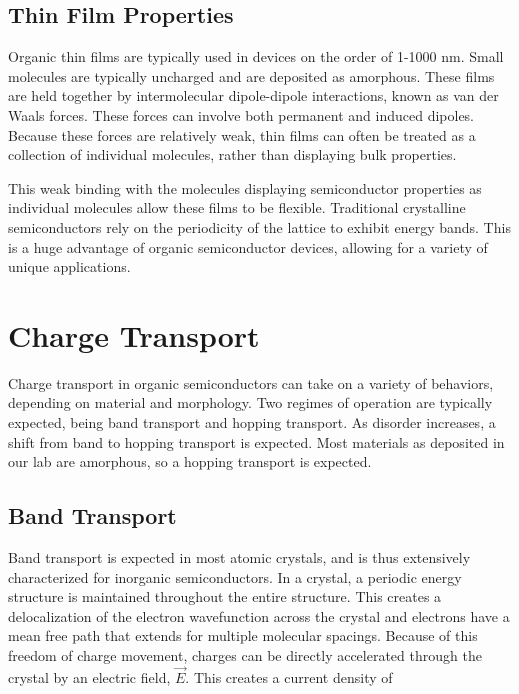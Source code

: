 \documentclass[../thesis.tex]{subfiles}
\begin{document}
\subsection{Thin Film Properties}

Organic thin films are typically used in devices on the order of 1-1000 nm.  
Small molecules are typically uncharged and are deposited as amorphous.
These films are held together by intermolecular dipole-dipole interactions, known as van der Waals forces.
These forces can involve both permanent and induced dipoles.
Because these forces are relatively weak, thin films can often be treated as a collection of individual molecules, rather than displaying bulk properties.

This weak binding with the molecules displaying semiconductor properties as individual molecules allow these films to be flexible.
Traditional crystalline semiconductors rely on the periodicity of the lattice to exhibit energy bands.  
This is a huge advantage of organic semiconductor devices, allowing for a variety of unique applications.

\section{Charge Transport}

Charge transport in organic semiconductors can take on a variety of behaviors, depending on material and morphology.\supercite{Pope1999,Mark1962}
Two regimes of operation are typically expected, being band transport and hopping transport.  
As disorder increases, a shift from band to hopping transport is expected.
Most materials as deposited in our lab are amorphous, so a hopping transport is expected.

\subsection{Band Transport}

Band transport is expected in most atomic crystals, and is thus extensively characterized for inorganic semiconductors.\supercite{Kasap1997}
In a crystal, a periodic energy structure is maintained throughout the entire structure.
This creates a delocalization of the electron wavefunction across the crystal and electrons have a mean free path that extends for multiple molecular spacings.
Because of this freedom of charge movement, charges can be directly accelerated through the crystal by an electric field, $\vec{E}$.
This creates a current density of 
\end{document}
